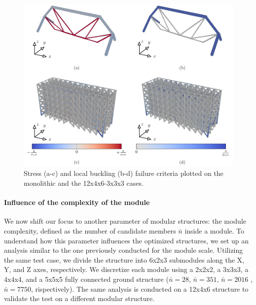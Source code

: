     \begin{figure}
        \centering
        \includegraphics[width=\linewidth]{figures/05_cellular_opt/00_module_scale_failure/12x4x6_mech.pdf}
        \caption{Stress (a-c) and local buckling (b-d) failure criteria plotted on the monolithic and the 12x4x6-3x3x3 cases.}
        \label{fig:05_scale_failure}
    \end{figure}

\paragraph{Influence of the complexity of the module}
We now shift our focus to another parameter of modular structures: the module complexity, defined as the number of candidate members $\bar{n}$ inside a module. To understand how this parameter influences the optimized structures, we set up an analysis similar to the one previously conducted for the module scale. Utilizing the same test case, we divide the structure into 6x2x3 submodules along the X, Y, and Z axes, respectively. We discretize each module using a 2x2x2, a 3x3x3, a 4x4x4, and a 5x5x5 fully connected ground structure ($\bar{n}=28$, $\bar{n}=351$, $\bar{n}=2016$ , $\bar{n}=7750$, rispectively). The same analysis is conducted on a 12x4x6 structure to validate the test on a different modular structure.


